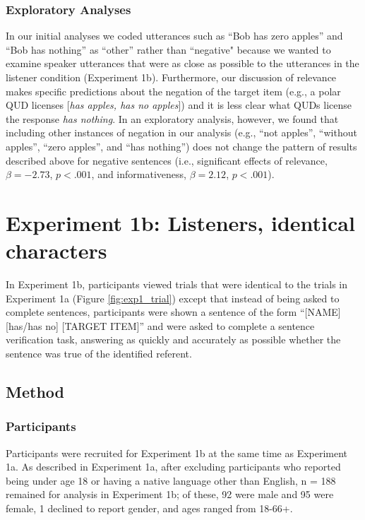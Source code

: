 \documentclass[man, floatsintext, noapacite]{apa6}
\begin{document}
\subsubsection{Exploratory Analyses}

In our initial analyses we coded utterances such as ``Bob has zero apples'' and ``Bob has nothing'' as ``other'' rather than ``negative" because we wanted to examine speaker utterances that were as close as possible to the utterances in the listener condition (Experiment 1b). Furthermore, our discussion of relevance makes specific predictions about the negation of the target item (e.g., a polar QUD licenses [\textit{has apples, has no apples}]) and it is less clear what QUDs license the response \textit{has nothing}. In an exploratory analysis, however, we found that including other instances of negation in our analysis (e.g., ``not apples'', ``without apples'', ``zero apples'', and ``has nothing'') does not change the pattern of results described above for negative sentences (i.e., significant effects of relevance, $\beta= -2.73$, $p< .001$, and informativeness, $\beta= 2.12$, $p< .001$). 

\section{Experiment 1b: Listeners, identical characters}

In Experiment 1b, participants viewed trials that were identical to the trials in Experiment 1a (Figure \ref{fig:exp1_trial}) except that instead of being asked to complete sentences, participants were shown a sentence of the form ``[NAME] [has/has no] [TARGET ITEM]'' and were asked to complete a sentence verification task, answering as quickly and accurately as possible whether the sentence was true of the identified referent. 

\subsection{Method}

\subsubsection{Participants} 

Participants were recruited for Experiment 1b at the same time as Experiment 1a. As described in Experiment 1a, after excluding participants who reported being under age 18 or having a native language other than English, n = 188 remained for analysis in Experiment 1b; of these, 92 were male and 95 were female, 1 declined to report gender, and ages ranged from 18-66+.
\end{document}
